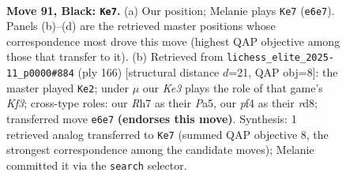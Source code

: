 \documentclass[11pt]{article}
\begin{document}
\begin{figure}[p]\centering
\begin{subfigure}{0.46\textwidth}\centering
\resizebox{\linewidth}{!}{%
\newchessgame
\chessboard[
  setfen={8/7r/p3k3/P1p2p1p/1pp2P1P/4P1P1/1P4K1/3R4 b - - 3 91},
  showmover=false,
  pgfstyle=straightmove, color=movearrow, markmove={e6-e7}
]}
\caption{}
\end{subfigure}\hfill
\begin{subfigure}{0.46\textwidth}\centering
\resizebox{\linewidth}{!}{%
\newchessgame
\chessboard[
  setfen={3r4/1p6/p1p2kp1/P6p/1P3P1P/4PK2/2R5/8 w - - 3 84},
  showmover=false,
  pgfstyle=straightmove, color=movearrow, markmove={f3-e2}
]}
\caption{}
\end{subfigure}
\\[4pt]

\caption{\textbf{Move 91, Black: \texttt{Ke7}.} (a) Our position; Melanie plays \texttt{Ke7} (\texttt{e6e7}). Panels (b)--(d) are the retrieved master positions whose correspondence most drove this move (highest QAP objective among those that transfer to it). (b) Retrieved from \texttt{lichess\_elite\_2025-11\_p0000\#884} (ply 166) [structural distance $d$=21, QAP obj=8]: the master played \texttt{Ke2}; under $\mu$ our \emph{Ke3} plays the role of that game's \emph{Kf3}; cross-type roles: our \emph{R}h7 as their \emph{P}a5, our \emph{p}f4 as their \emph{r}d8; transferred move \texttt{e6e7} \textbf{(endorses this move)}. Synthesis: 1 retrieved analog transferred to \texttt{Ke7} (summed QAP objective 8, the strongest correspondence among the candidate moves); Melanie committed it via the \texttt{search} selector.}
\label{fig:thought-m181}
\end{figure}

\clearpage
\end{document}
